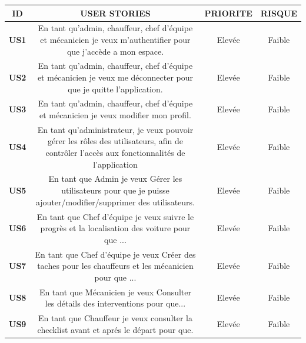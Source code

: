    


\begin{table}[htbp]
    \centering
    \renewcommand{\arraystretch}{4.15} %
    \begin{tabular}{|c|c|c|c|}
        \hline
        \textbf{ID} &  \textbf{USER STORIES}  & \textbf{PRIORITE} & \textbf{RISQUE}  \\

       
        \hline
        \textbf{US1} & \parbox{9cm}{\centering En tant qu'admin, chauffeur, chef d'équipe et mécanicien je veux m'authentifier pour que j'accède a mon espace.} & Elevée & Faible  \\
        \hline
        \textbf{US2} & \parbox{10cm}{\centering En tant qu'admin, chauffeur, chef d'équipe et mécanicien je veux me déconnecter pour que je quitte l'application.} & Elevée & Faible \\
        \hline
        \textbf{US3} &\parbox{10cm}{\centering En tant qu'admin, chauffeur, chef d'équipe et mécanicien je veux modifier mon profil.} & Elevée & Faible \\
        \hline
        \textbf{US4} & \parbox{10cm}{\centering En tant qu'administrateur, je veux pouvoir gérer les rôles des utilisateurs, afin de contrôler l'accès aux fonctionnalités de l'application} & Elevée & Faible \\
        \hline
        \textbf{US5} & \parbox{10cm}{\centering En tant que Admin je veux Gérer les utilisateurs pour que je puisse ajouter/modifier/supprimer des utilisateurs. } & Elevée & Faible \\
        

         
         \hline
        \textbf{US6} & \parbox{10cm}{\centering En tant que Chef d'équipe je veux suivre le progrès et la localisation des voiture pour que ...} & Elevée & Faible  \\
        \hline
        \textbf{US7} & \parbox{10cm}{\centering En tant que Chef d'équipe je veux Créer des taches pour les chauffeurs et les mécanicien pour que ...} & Elevée & Faible \\
        \hline
        \textbf{US8} & \parbox{10cm}{\centering En tant que Mécanicien je veux Consulter les détails des interventions pour que...} & Elevée & Faible \\
        \hline
        \textbf{US9} & \parbox{10cm}{\centering En tant que Chauffeur je veux consulter la checklist avant et aprés le départ pour que. } & Elevée & Faible \\
        

\end{tabular}
\end{table}
